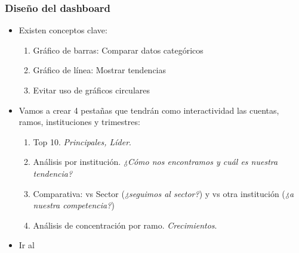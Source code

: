 \begin{frame}
    \frametitle{Diseño del dashboard}
    \begin{itemize}
        \item<1-> Existen conceptos clave:
        \begin{enumerate}
            \item<2-> Gráfico de barras: Comparar datos categóricos
            \item<3-> Gráfico de línea: Mostrar tendencias
            \item<4-> Evitar uso de gráficos circulares
        \end{enumerate}
        \item<5-> Vamos a crear 4 pestañas que tendrán como interactividad las cuentas, ramos, instituciones y trimestres:
        \begin{enumerate}
            \item<6-> Top 10. \textit{Principales, Líder}.
            \item<7-> Análisis por institución. \textit{¿Cómo nos encontramos y cuál es nuestra tendencia?}
            \item<8-> Comparativa: vs Sector (\textit{¿seguimos al sector?}) y vs otra institución (\textit{¿a nuestra competencia?})
            \item<9-> Análisis de concentración por ramo. \textit{Crecimientos}.
        \end{enumerate}
        \item<10-> Ir al 
  \end{itemize}
\end{frame}